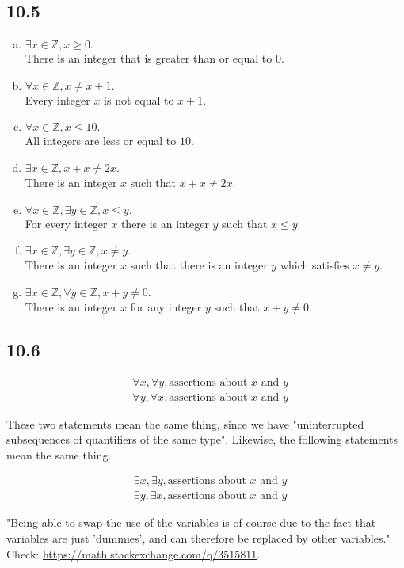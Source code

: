 \documentclass{article}
\begin{document}
\subsection*{10.5}
\begin{enumerate}[a.]
    \item $\exists x \in \mathbb{Z}, x \geq 0.$
    \\There is an integer that is greater than or equal to $0$.
    \item $\forall x \in \mathbb{Z}, x \neq x+1.$
    \\Every integer $x$ is not equal to $x+1$.
    \item $\forall x \in \mathbb{Z}, x \leq 10.$
    \\All integers are less or equal to $10$.
    \item $\exists x \in \mathbb{Z}, x + x \neq 2x.$
    \\There is an integer $x$ such that $x + x \neq 2x.$
    \item $\forall x \in \mathbb{Z}, \exists y \in \mathbb{Z}, x \leq y.$
    \\For every integer $x$ there is an integer $y$ such that $x \leq y$.
    \item $\exists x \in \mathbb{Z}, \exists y \in \mathbb{Z}, x \neq y.$
    \\There is an integer $x$ such that there is an integer $y$ which satisfies $x \neq y$.
    \item $\exists x \in \mathbb{Z}, \forall y \in \mathbb{Z}, x + y \neq 0.$
    \\There is an integer $x$ for any integer $y$ such that $x+y\neq0$.
\end{enumerate}

\subsection*{10.6}
$$\begin{aligned}
&\forall x, \forall y, \textrm{assertions about }x\textrm{ and }y\\
&\forall y, \forall x, \textrm{assertions about }x\textrm{ and }y\end{aligned}$$

These two statements mean the same thing, since we have "uninterrupted subsequences of quantifiers of the same type". Likewise, the following statements mean the same thing.

$$\begin{aligned}
&\exists x, \exists y, \textrm{assertions about }x\textrm{ and }y\\
&\exists y, \exists x, \textrm{assertions about }x\textrm{ and }y\end{aligned}$$

"Being able to swap the use of the variables is of course due to the fact that variables are just 'dummies', and can therefore be replaced by other variables." Check: \url{https://math.stackexchange.com/q/3515811}.
\end{document}
